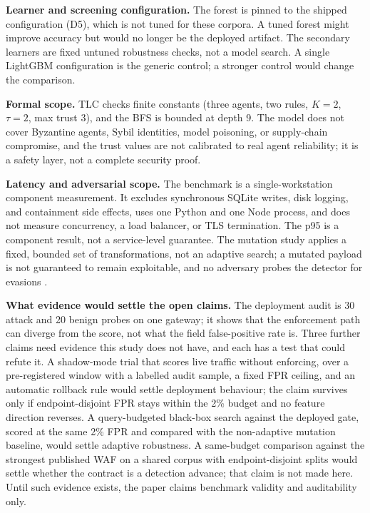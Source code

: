 \documentclass[preprint,11pt]{elsarticle}
\begin{document}
\textbf{Learner and screening configuration.} The forest is pinned to
the shipped configuration (D5), which is not tuned for these corpora. A
tuned forest might improve accuracy but would no longer be the deployed
artifact. The secondary learners are fixed untuned robustness checks,
not a model search. A single LightGBM configuration is the generic
control; a stronger control would change the comparison.

\textbf{Formal scope.} TLC checks finite constants (three agents, two
rules, \(K=2\), \(\tau=2\), max trust 3), and the BFS is bounded at
depth 9. The model does not cover Byzantine agents, Sybil identities,
model poisoning, or supply-chain compromise, and the trust values are
not calibrated to real agent reliability; it is a safety layer, not a
complete security proof.

\textbf{Latency and adversarial scope.} The benchmark is a
single-workstation component measurement. It excludes synchronous SQLite
writes, disk logging, and containment side effects, uses one Python and
one Node process, and does not measure concurrency, a load balancer, or
TLS termination. The p95 is a component result, not a service-level
guarantee. The mutation study applies a fixed, bounded set of
transformations, not an adaptive search; a mutated payload is not
guaranteed to remain exploitable, and no adversary probes the detector
for evasions \citep{biggio2018wild}.

\textbf{What evidence would settle the open claims.} The deployment
audit is 30 attack and 20 benign probes on one gateway; it shows that
the enforcement path can diverge from the score, not what the field
false-positive rate is. Three further claims need evidence this study
does not have, and each has a test that could refute it. A shadow-mode
trial that scores live traffic without enforcing, over a pre-registered
window with a labelled audit sample, a fixed FPR ceiling, and an
automatic rollback rule would settle deployment behaviour; the claim
survives only if endpoint-disjoint FPR stays within the 2\% budget and
no feature direction reverses. A query-budgeted black-box search against
the deployed gate, scored at the same 2\% FPR and compared with the
non-adaptive mutation baseline, would settle adaptive robustness. A
same-budget comparison against the strongest published WAF on a shared
corpus with endpoint-disjoint splits would settle whether the contract
is a detection advance; that claim is not made here. Until such evidence
exists, the paper claims benchmark validity and auditability only.
\end{document}
